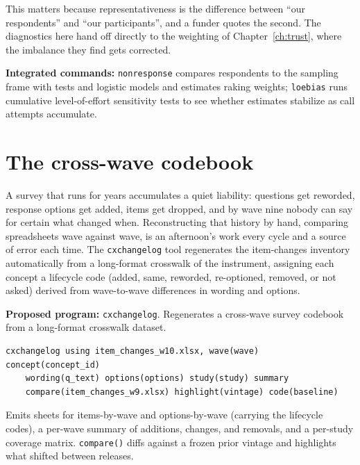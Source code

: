 \documentclass[
    a4paper,
    fontsize=10pt,
    twoside=true,
    numbers=noenddot,
]{kaobook}
\begin{document}
This matters because representativeness is the difference between \enquote{our respondents} and \enquote{our participants}, and a funder quotes the second. The diagnostics here hand off directly to the weighting of Chapter~\ref{ch:trust}, where the imbalance they find gets corrected.

\begin{kaobox}[frametitle=Package Integration: \texttt{nonresponse} and \texttt{loebias}]
\textbf{Integrated commands:} \texttt{nonresponse} compares respondents to the sampling frame with tests and logistic models and estimates raking weights; \texttt{loebias} runs cumulative level-of-effort sensitivity tests to see whether estimates stabilize as call attempts accumulate.
\end{kaobox}

\section{The cross-wave codebook}\label{sec:cxchangelog}
A survey that runs for years accumulates a quiet liability: questions get reworded, response options get added, items get dropped, and by wave nine nobody can say for certain what changed when. Reconstructing that history by hand, comparing spreadsheets wave against wave, is an afternoon's work every cycle and a source of error each time. The \texttt{cxchangelog} tool regenerates the item-changes inventory automatically from a long-format crosswalk of the instrument, assigning each concept a lifecycle code (added, same, reworded, re-optioned, removed, or not asked) derived from wave-to-wave differences in wording and options.

\begin{kaobox}[frametitle=Ado-file Idea: \texttt{cxchangelog}]
\textbf{Proposed program:} \texttt{cxchangelog}. Regenerates a cross-wave survey codebook from a long-format crosswalk dataset.
{\footnotesize
\begin{verbatim}
cxchangelog using item_changes_w10.xlsx, wave(wave) concept(concept_id)
    wording(q_text) options(options) study(study) summary
    compare(item_changes_w9.xlsx) highlight(vintage) code(baseline)
\end{verbatim}
}
Emits sheets for items-by-wave and options-by-wave (carrying the lifecycle codes), a per-wave summary of additions, changes, and removals, and a per-study coverage matrix. \texttt{compare()} diffs against a frozen prior vintage and highlights what shifted between releases.
\end{kaobox}
\end{document}
